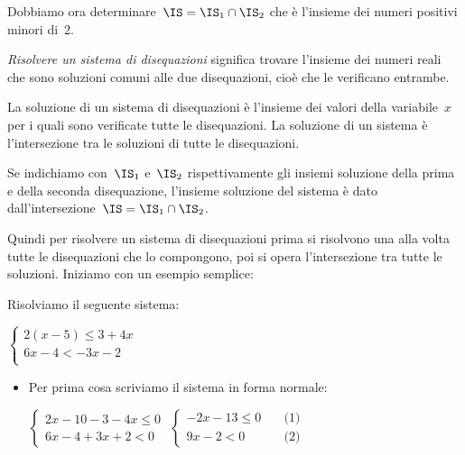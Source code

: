Dobbiamo ora determinare~$\IS=\IS_{1}\cap\IS_{2}$ che è l'insieme
dei numeri positivi minori di~2.

 \begin{esempio}

\emph{Risolvere un sistema di disequazioni} significa trovare
l'insieme dei numeri reali che sono soluzioni comuni
alle due disequazioni, cioè che le verificano entrambe.

La soluzione di un sistema di disequazioni è l'insieme dei valori della 
variabile~$x$ per i quali sono verificate tutte le disequazioni.
La soluzione di un sistema è l'intersezione tra le soluzioni di tutte le 
disequazioni.

Se indichiamo con~$\IS_{1}$ e~$\IS_{2}$
rispettivamente gli insiemi soluzione della prima e della seconda
disequazione, l'insieme soluzione del sistema è dato
dall'intersezione~$\IS=\IS_{1}\cap\IS_{2}$.

Quindi per risolvere un sistema di disequazioni prima si risolvono una alla 
volta tutte le disequazioni che lo compongono, poi si opera l'intersezione 
tra tutte le soluzioni. Iniziamo con un esempio semplice:

Risolviamo il seguente sistema:

$\left\{\begin{array}{l}
  2 (x -5) \le 3 + 4 x \\
  6 x -4 < -3 x -2 \\
\end{array}\right.$

\begin{itemize} [noitemsep]
 \item Per prima cosa scriviamo il sistema in forma normale:
 
$\left\{\begin{array}{l}
  2 x -10 -3 - 4 x \le 0 \\
  6 x -4 +3 x +2 < 0
\end{array}\right.$
$\left\{\begin{array}{ll}
  -2 x -13 \le 0 & \quad \mbox{(1)} \\
   9 x -2 < 0 & \quad \mbox{(2)}
\end{array}\right.$


\end{itemize}
\end{esempio}
